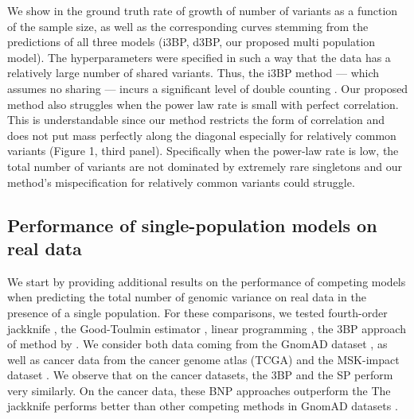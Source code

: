 We show in  the ground truth rate of growth of number of variants as a function of the sample size, as well as the corresponding curves stemming from the predictions of all three models (i3BP, d3BP, our proposed multi population model). The hyperparameters were specified in such a way that the data has a relatively large number of shared variants. Thus, the i3BP method  --- which assumes no sharing --- incurs a significant level of double counting . Our proposed method also struggles when the power law rate is small with perfect correlation. This is understandable since our method restricts the form of correlation and does not put mass perfectly along the diagonal especially for relatively common variants (Figure 1, third panel). Specifically when the power-law rate is low, the total number of variants are not dominated by extremely rare singletons and our method's mispecification for relatively common variants could struggle. 



\subsection{Performance of single-population models on real data}

\label{sec:single_pop_methods}

We start by providing additional results on the performance of competing models when predicting the total number of genomic variance on real data in the presence of a single population.
For these comparisons, we tested fourth-order jackknife \citep[4JK,]{gravel2014predicting}, the Good-Toulmin estimator \citep[GT,]{Orlitsky2016,chakraborty2019using}, linear programming \citep[LP]{zou2016quantifying}, the 3BP approach of \citet{Masoero2022}  method by \citet{Camerlenghi2021}.
We consider both data coming from the GnomAD dataset \citep{karczewski2020mutational}, as well as cancer data from the cancer genome atlas (TCGA) and the MSK-impact dataset \citep{cheng2015memorial}.
We observe that on the cancer datasets, the 3BP and the SP perform very similarly.  On the cancer data, these BNP approaches outperform the  The jackknife performs better than other competing methods in GnomAD datasets . 

